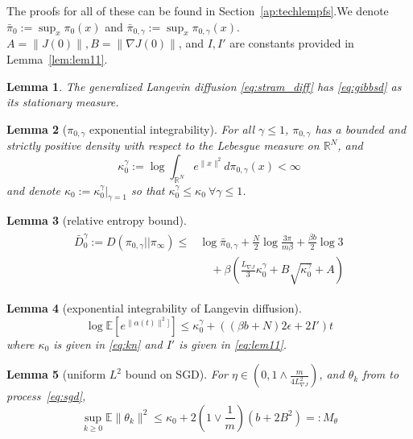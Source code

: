 \documentclass[journal,onecolumn]{IEEEtran}
\newtheorem{lemma}{Lemma}
\newcommand{\thk}{\theta_k}
\newcommand{\step}{\epsilon}
\newcommand{\grad}{\nabla}
\newcommand{\rew}{J}
\newcommand{\reals}{\mathbb{R}}
\newcommand{\CE}{\mathbb{E}}
\newcommand{\alt}{\alpha(t)}
\newcommand{\dimn}{N}
\newcommand{\kn}{\kappa_0}
\newcommand{\knw}{\kn^{\idw}}
\newcommand{\KL}{D}
\newcommand{\gibbs}{\ids_{\infty}}
\newcommand{\idistr}{\ids_0}
\newcommand{\sgdstep}{\eta}
\newcommand{\etsup}{M_{\theta}}
\newcommand{\ids}{\pi}
\newcommand{\idistmax}{\bar{\ids}_0}
\newcommand{\idw}{\gamma}
\newcommand{\isp}{0,\idw}
\newcommand{\idistmaxw}{\bar{\ids}_{\isp}}
\newcommand{\relentbd}{\bar{\KL}_0}
\newcommand{\relentbdw}{\relentbd^{\idw}}
\newcommand{\constA}{A}
\newcommand{\constB}{B}
\newcommand{\idiffc}{I}
\newcommand{\idiffcc}{I'}
\newcommand{\dissm}{m}
\newcommand{\dissb}{b}
\newcommand{\idistrw}{\ids_{\isp}}
\newcommand{\lipGJ}{L_{\grad\rew}}
\begin{document}
{\label{ap:techres}

The proofs for all of these can be found in Section~\ref{ap:techlempfs}.We denote $\idistmax := \sup_{x}\idistr(x)$ and $\idistmaxw := \sup_{x}\idistrw(x)$. $A = \|\rew(0)\|, B = \|\grad\rew(0)\|$, and $\idiffc, \idiffcc$ are constants provided in Lemma~\ref{lem:lem11}.

{\color{black}
\begin{lemma}
\label{lem:gendiffstat}
The generalized Langevin diffusion \eqref{eq:stram_diff} has \eqref{eq:gibbsd} as its stationary measure. 
\end{lemma}
}

\begin{lemma}[$\idistrw$ exponential integrability]
\label{lem:idistr}
 For all $\idw \leq 1$, $\idistrw$ has a bounded and strictly positive density with respect to the Lebesgue measure on $\reals^{\dimn}$, and
\begin{equation}
\label{eq:kn}
 \knw := \log \int_{\reals^{\dimn}}e^{\|x\|^2}d\idistrw(x) < \infty
 \end{equation}
 and denote $\kn := \knw |_{\idw=1}$ so that $\knw \leq \kn \ \forall \idw \leq 1$.
\end{lemma}

\begin{lemma}[relative entropy bound]
\label{lem:relentropy}
\begin{align}
    \label{eq:relentropy}
    \begin{split}
       \relentbdw := \KL(\idistrw || \gibbs) \leq &\log\idistmaxw + \frac{\dimn}{2} \log\frac{3\pi}{\dissm\beta} + \frac{\beta \dissb}{2}\log3 \\&\quad + \beta\left(\frac{\lipGJ}{3}\knw + \constB\sqrt{\knw} + \constA\right)
    \end{split}
\end{align}
\end{lemma}

\begin{lemma}[exponential integrability of Langevin diffusion]
\label{lem:exp_int}
\[\log\CE[e^{\|\alt\|^2]}] \leq \knw + ((\beta \dissb + \dimn)2\step + 2 \idiffcc) t \]
where $\kn$ is given in \eqref{eq:kn} and $\idiffcc$ is given in \eqref{eq:lem11}.
\end{lemma}

\begin{lemma}[uniform $L^2$ bound on SGD]
\label{lem:unifL2}
For $\sgdstep \in (0, 1 \wedge \frac{\dissm}{4\lipGJ^2})$, and $\thk$ from to process~\eqref{eq:sgd}, 
\begin{equation}
\sup_{k\geq 0}\CE\|\thk\|^2 \leq \kn + 2\left(1 \vee \frac{1}{\dissm}\right)\left(\dissb + 2\constB^2\right) =: \etsup
\end{equation}
\end{lemma}

}
\end{document}
